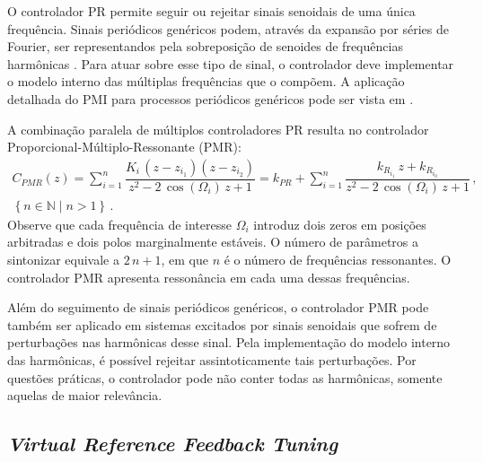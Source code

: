 \documentclass[repeatfields,oneside,overleaf]{tcc}
\newcommand{\mycdot}{ \, }
\newcommand{\myC}[2][]{ C_{#1} \left( #2 \right) }
\begin{document}
O controlador PR permite seguir ou rejeitar sinais senoidais de uma única frequência.
Sinais periódicos genéricos podem, através da expansão por séries de Fourier, ser representandos pela sobreposição de senoides de frequências harmônicas \cite{Haykin2001, Kreyszig2014}.
Para atuar sobre esse tipo de sinal, o controlador deve implementar o modelo interno das múltiplas frequências que o compõem.
A aplicação detalhada do PMI para processos periódicos genéricos pode ser vista em \cite{Flores2012}.

A combinação paralela de múltiplos controladores PR resulta no controlador Pro\-por\-ci\-o\-nal-Múl\-ti\-plo-Res\-so\-nan\-te (PMR):
\begin{equation}
\begin{gathered}
    \myC[PMR]{z}
    = \sum_{i=1}^{n} \dfrac{ K_i \mycdot (z - z_{i_1}) (z - z_{i_2}) }
                           { z^2 - 2 \mycdot \cos \left( \Omega_i \right) \mycdot z + 1 }
    = k_{PR} + \sum_{i=1}^{n} \dfrac{ k_{R_{i_1}} \mycdot z + k_{R_{i_0}} }
                                 { z^2 - 2 \mycdot \cos \left( \Omega_i \right) \mycdot z + 1 }
    \,,
    \\
    \left\{ n \in \mathbb{N} \mid n > 1 \right\}
    \,.
\end{gathered}
\end{equation}
Observe que cada frequência de interesse $\Omega_i$ introduz dois zeros em posições arbitradas e dois polos marginalmente estáveis.
O número de parâmetros a sintonizar equivale a $2 \mycdot n + 1$, em que $n$ é o número de frequências ressonantes.
O controlador PMR apresenta ressonância em cada uma dessas frequências.

Além do seguimento de sinais periódicos genéricos, o controlador PMR pode também ser aplicado em sistemas excitados por sinais senoidais que sofrem de perturbações nas harmônicas desse sinal.
Pela implementação do modelo interno das harmônicas, é possível rejeitar assintoticamente tais perturbações.
Por questões práticas, o controlador pode não conter todas as harmônicas, somente aquelas de maior relevância.

\subsection{\textit{Virtual Reference Feedback Tuning}}\label{sec:VRFT}
\end{document}
